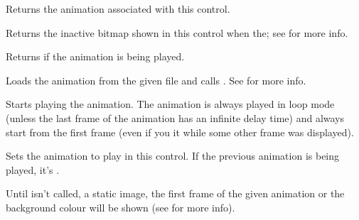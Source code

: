 Returns the animation associated with this control.


\label{wxanimationctrlgetinactivebitmap}


Returns the inactive bitmap shown in this control when the;
see  for more info.


\label{wxanimationctrlisplaying}


Returns \true if the animation is being played.


\label{wxanimationctrlloadfile}


Loads the animation from the given file and calls .
See  for more info.


\label{wxanimationctrlplay}


Starts playing the animation.
The animation is always played in loop mode (unless the last frame of the animation
has an infinite delay time) and always start from the first frame
(even if you  it while some other frame was
displayed).


\label{wxanimationctrlsetanimation}


Sets the animation to play in this control.
If the previous animation is being played, it's .

Until  isn't called, a static image, the first
frame of the given animation or the background colour will be shown
(see  for more info).


\label{wxanimationctrlsetinactivebitmap}


